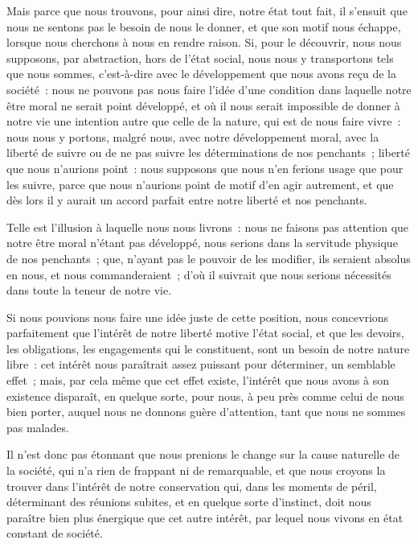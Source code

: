 \documentclass[french,twoside]{book} %
\begin{document}
Mais parce que nous trouvons, pour ainsi dire, notre état tout fait, il s’ensuit que nous ne sentons pas le besoin de nous le donner, et que son motif nous échappe, lorsque nous cherchons à nous en rendre raison. Si, pour le découvrir, nous nous supposons, par abstraction, hors de l’état social, nous nous y transportons tels que nous sommes, c’est-à-dire avec le développement que nous avons reçu de la société : nous ne pouvons pas nous faire l’idée d’une condition dans laquelle notre être moral ne serait point développé, et où il nous serait impossible de donner à notre vie une intention autre que celle de la nature, qui est de nous faire vivre : nous nous y portons, malgré nous, avec notre développement moral, avec la liberté de suivre ou de ne pas suivre les déterminations de nos penchants ; liberté que nous n’aurions point : nous supposons que nous n’en ferions usage que pour les suivre, parce que nous n’aurions point de motif d’en agir autrement, et que dès lors il y aurait un accord parfait entre notre liberté et nos penchants.\par
Telle est l’illusion à laquelle nous nous livrons : nous ne faisons pas attention que notre être moral n’étant pas développé, nous serions dans la servitude physique de nos penchants ; que, n’ayant pas le pouvoir de les modifier, ils seraient absolus en nous, et nous commanderaient ; d’où il suivrait que nous serions nécessités dans toute la teneur de notre vie.\par
Si nous pouvions nous faire une idée juste de cette position, nous concevrions parfaitement que l’intérêt de notre liberté motive l’état social, et que les devoirs, les obligations, les engagements qui le constituent, sont un besoin de notre nature libre : cet intérêt nous paraîtrait assez puissant pour déterminer, un semblable effet ; mais, par cela même que cet effet existe, l’intérêt que nous avons à son existence disparaît, en quelque sorte, pour nous, à peu près comme celui de nous bien porter, auquel nous ne donnons guère d’attention, tant que nous ne sommes pas malades.\par
Il n’est donc pas étonnant que nous prenions le change sur la cause naturelle de la société, qui n’a rien de frappant ni de remarquable, et que nous croyons la trouver dans l’intérêt de notre conservation qui, dans les moments de péril, déterminant des réunions subites, et en quelque sorte d’instinct, doit nous paraître bien plus énergique que cet autre intérêt, par lequel nous vivons en état constant de société.\par
\end{document}
